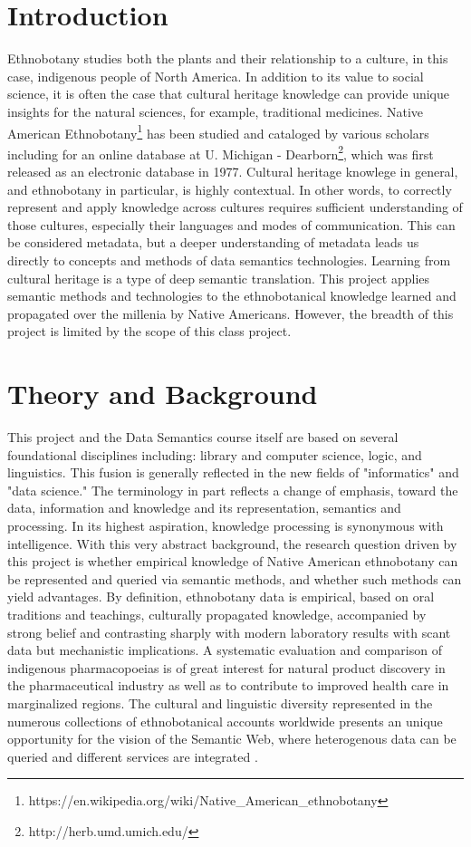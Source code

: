 \documentclass{acm_proc_article-sp}
\begin{document}
\section{Introduction}
Ethnobotany studies both the plants and their relationship to a culture, in this case, indigenous people of North America. In addition to its value to social science, it is often the case that cultural heritage knowledge\cite{Hyvonen:cult} can provide unique insights for the natural sciences, for example, traditional medicines. Native American Ethnobotany\footnote{https://en.wikipedia.org/wiki/Native\_American\_ethnobotany} has been studied and cataloged by various scholars\cite{moerman:native} including for an online database at U. Michigan - Dearborn\footnote{http://herb.umd.umich.edu/}, which was first released as an electronic database in 1977. Cultural heritage knowlege in general, and ethnobotany in particular, is highly contextual. In other words, to correctly represent and apply knowledge across cultures requires sufficient understanding of those cultures, especially their languages and modes of communication.  This can be considered metadata, but a deeper understanding of metadata leads us directly to concepts and methods of data semantics technologies. Learning from cultural heritage is a type of deep semantic translation.  This project applies semantic methods and technologies to the ethnobotanical knowledge learned and propagated over the  millenia by Native Americans.  However, the breadth of this project is limited by the scope of this class project.


\section{Theory and Background}
This project and the Data Semantics course itself are based on several foundational disciplines including: library and computer science, logic, and linguistics\cite{Allemang:swftwo}.  This fusion is generally reflected in the new fields of "informatics" and "data science." The terminology in part reflects a change of emphasis, toward the data, information and knowledge and its representation, semantics and processing. In its highest aspiration, knowledge processing is synonymous with intelligence. With this very abstract background, the research question driven by this project is whether empirical knowledge of Native American ethnobotany can be represented and queried via semantic methods, and whether such methods can yield advantages. By definition, ethnobotany data is empirical, based on oral traditions and teachings, culturally propagated knowledge, accompanied by strong belief and contrasting sharply with modern laboratory results with scant data but mechanistic implications. A systematic evaluation and comparison of indigenous pharmacopoeias is of great interest for natural product discovery in the pharmaceutical industry as well as to contribute to improved health care in marginalized regions. The cultural and linguistic diversity represented in the numerous collections of ethnobotanical accounts worldwide presents an unique opportunity for the vision of the Semantic Web, where heterogenous data can be queried and different services are integrated \cite{bizer:2009}. 
\end{document}
